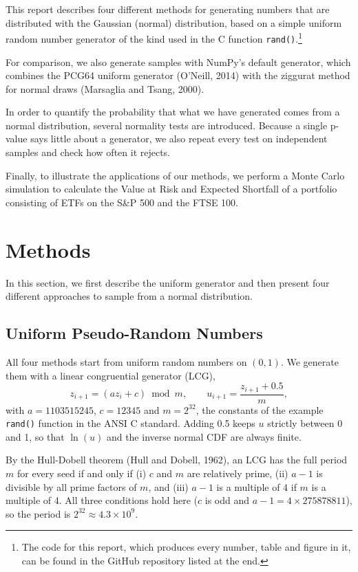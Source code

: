 \documentclass[12pt,a4paper]{article}
\begin{document}
This report describes four different methods for generating numbers that are distributed with the Gaussian (normal) distribution, based on a simple uniform random number generator of the kind used in the C function \texttt{rand()}.\footnote{The code for this report, which produces every number, table and figure in it, can be found in the GitHub repository listed at the end.}

For comparison, we also generate samples with NumPy's default generator, which combines the PCG64 uniform generator (O'Neill, 2014) with the ziggurat method for normal draws (Marsaglia and Tsang, 2000).

In order to quantify the probability that what we have generated comes from a normal distribution, several normality tests are introduced. Because a single p-value says little about a generator, we also repeat every test on \Reps{} independent samples and check how often it rejects.

Finally, to illustrate the applications of our methods, we perform a Monte Carlo simulation to calculate the Value at Risk and Expected Shortfall of a portfolio consisting of ETFs on the S\&P 500 and the FTSE 100.

\section{Methods}

In this section, we first describe the uniform generator and then present four different approaches to sample from a normal distribution.

\subsection{Uniform Pseudo-Random Numbers}

All four methods start from uniform random numbers on $(0,1)$. We generate them with a linear congruential generator (LCG),
\[
z_{i+1} = (a z_i + c) \bmod m, \qquad u_{i+1} = \frac{z_{i+1} + 0.5}{m},
\]
with $a = 1103515245$, $c = 12345$ and $m = 2^{32}$, the constants of the example \texttt{rand()} function in the ANSI C standard. Adding 0.5 keeps $u$ strictly between 0 and 1, so that $\ln(u)$ and the inverse normal CDF are always finite.

By the Hull-Dobell theorem (Hull and Dobell, 1962), an LCG has the full period $m$ for every seed if and only if (i) $c$ and $m$ are relatively prime, (ii) $a-1$ is divisible by all prime factors of $m$, and (iii) $a-1$ is a multiple of 4 if $m$ is a multiple of 4. All three conditions hold here ($c$ is odd and $a - 1 = 4 \times 275878811$), so the period is $2^{32} \approx 4.3 \times 10^{9}$.
\end{document}
